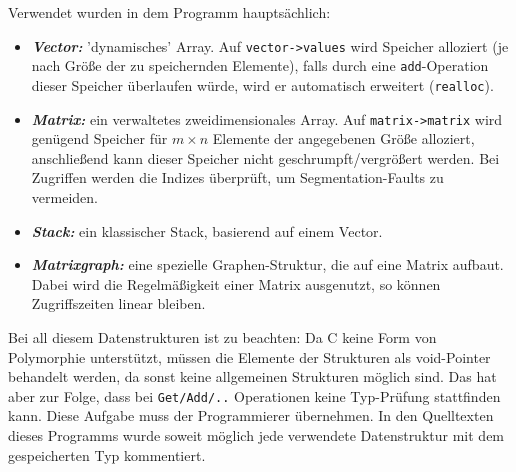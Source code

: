 Verwendet wurden in dem Programm hauptsächlich:

\begin{itemize}
	\item \textsl{\textbf{Vector:}} 'dynamisches' Array. Auf \verb+vector->values+ wird Speicher alloziert (je nach Größe der zu speichernden Elemente), falls durch eine \verb+add+-Operation dieser Speicher überlaufen würde, wird er automatisch erweitert (\verb+realloc+).
	\item \textsl{\textbf{Matrix:}} ein verwaltetes zweidimensionales Array. Auf \verb+matrix->matrix+ wird genügend Speicher für $m \times n$ Elemente der angegebenen Größe alloziert, anschließend kann dieser Speicher nicht geschrumpft/vergrößert werden. Bei Zugriffen werden die Indizes überprüft, um Segmentation-Faults zu vermeiden.
	\item \textsl{\textbf{Stack:}} ein klassischer Stack, basierend auf einem Vector.
	\item \textsl{\textbf{Matrixgraph:}} eine spezielle Graphen-Struktur, die auf eine Matrix aufbaut. Dabei wird die Regelmäßigkeit einer Matrix ausgenutzt, so können Zugriffszeiten linear bleiben.
\end{itemize}

Bei all diesem Datenstrukturen ist zu beachten: Da C keine Form von Polymorphie unterstützt, müssen die Elemente der Strukturen als void-Pointer behandelt werden, da sonst keine allgemeinen Strukturen möglich sind. Das hat aber zur Folge, dass bei \verb+Get/Add/..+ Operationen keine Typ-Prüfung stattfinden kann. Diese Aufgabe muss der Programmierer übernehmen. In den Quelltexten dieses Programms wurde soweit möglich jede verwendete Datenstruktur mit dem gespeicherten Typ kommentiert.